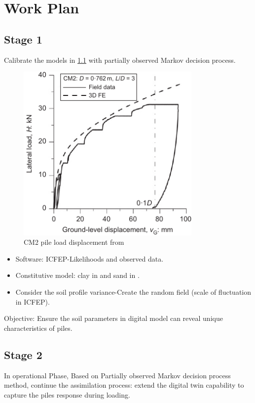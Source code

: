 \chapter{Work Plan}

\label{Work_Plan}

\section{Stage 1}
Calibrate the models in \cref{fig: CM2pile} with partially observed Markov decision process.
\begin{figure}[H]
    \centering

    \includegraphics[width = 90mm]{Figures/figure-CM2.pdf}
    \caption{CM2 pile load displacement from \protect\cite{zdravkovic2020}}
    \label{fig: CM2pile}
\end{figure}

\begin{itemize}
    \item Software: ICFEP-Likelihoods and observed data.
    \item Constitutive model: clay in \cite{zdravkovic2020} and sand in \cite{taborda2020}.
    \item Consider the soil profile variance-Create the random field (scale of fluctuation in ICFEP).
\end{itemize}
Objective: Ensure the soil parameters in digital model can reveal unique characteristics of piles.

\section{Stage 2}
In operational Phase, Based on Partially observed Markov decision process method, continue the assimilation process: extend the digital twin capability to capture the piles response during loading.

